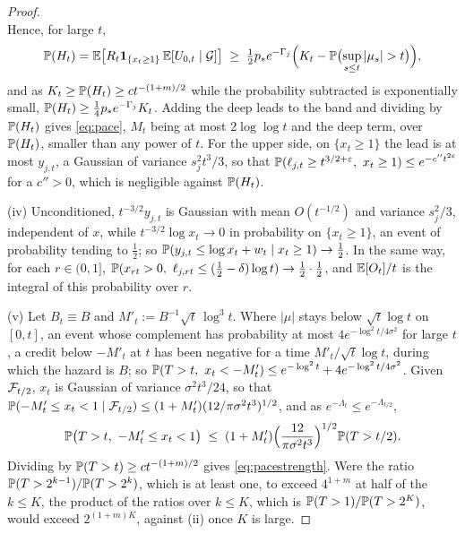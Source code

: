 \begin{proof}
\[\]
Hence, for large $t$,
\[
\PP(H_t)=\E\bigl[R_t\one_{\{x_t\ge1\}}\,\E[U_{0,t}\mid\mathcal G]\bigr]
\;\ge\;\tfrac12p_*e^{-\Gamma_j}\Bigl(K_t-\PP\bigl(\sup_{s\le t}|\mu_s|>t\bigr)\Bigr),
\]
and as $K_t\ge\mathbb{P}(H_t)\ge ct^{-(1+m)/2}$ while the probability subtracted
is exponentially small, $\mathbb{P}(H_t)\ge\tfrac14p_*e^{-\Gamma_j}K_t$. Adding
the deep leads to the band and dividing by $\mathbb{P}(H_t)$ gives
\eqref{eq:pace}, $M_t$ being at most $2\log\log t$ and the deep term, over
$\mathbb{P}(H_t)$, smaller than any power of $t$. For the upper side, on
$\{x_t\ge1\}$ the lead is at most $y_{j,t}$, a Gaussian of variance
$s_j^2t^3/3$, so that
$\mathbb{P}(\ell_{j,t}\ge t^{3/2+\varepsilon},\ x_t\ge1)\le e^{-c''t^{2\varepsilon}}$
for a $c''>0$, which is negligible against $\mathbb{P}(H_t)$.

(iv) Unconditioned, $t^{-3/2}y_{j,t}$ is Gaussian with mean $O(t^{-1/2})$
and variance $s_j^2/3$, independent of $x$, while $t^{-3/2}\log x_t\to0$
in probability on $\{x_t\ge1\}$, an event of probability tending to
$\tfrac12$; so $\mathbb{P}(y_{j,t}\le\log x_t+w_t\mid x_t\ge1)\to\tfrac12$. In the
same way, for each $r\in(0,1]$,
$\PP(x_{rt}>0,\ \ell_{j,rt}\le(\tfrac12-\delta)\log t)\to\tfrac12\cdot\tfrac12$,
and $\mathbb{E}[O_t]/t$ is the integral of this probability over $r$.

(v) Let $B_t\equiv B$ and $M'_t:=B^{-1}\sqrt t\,\log^3t$. Where $|\mu|$
stays below $\sqrt t\log t$ on $[0,t]$, an event whose complement has
probability at most $4e^{-\log^2t/4\sigma^2}$ for large $t$, a credit
below $-M'_t$ at $t$ has been negative for a time $M'_t/\sqrt t\log t$,
during which the hazard is $B$; so
$\mathbb{P}(T>t,\ x_t<-M'_t)\le e^{-\log^2t}+4e^{-\log^2t/4\sigma^2}$. Given
$\mathcal{F}_{t/2}$, $x_t$ is Gaussian of variance $\sigma^2t^3/24$, so that
$\mathbb{P}(-M'_t\le x_t<1\mid\mathcal{F}_{t/2})\le(1+M'_t)(12/\pi\sigma^2t^3)^{1/2}$, and
as $e^{-\Lambda_t}\le e^{-\Lambda_{t/2}}$,
\[
\mathbb{P}\bigl(T>t,\ -M'_t\le x_t<1\bigr)\;\le\;
(1+M'_t)\Bigl(\frac{12}{\pi\sigma^2t^3}\Bigr)^{1/2}\mathbb{P}(T>t/2).
\]
Dividing by $\mathbb{P}(T>t)\ge ct^{-(1+m)/2}$ gives \eqref{eq:pacestrength}.
Were the ratio $\mathbb{P}(T>2^{k-1})/\mathbb{P}(T>2^k)$, which is at least one, to
exceed $4^{1+m}$ at half of the $k\le K$, the product of the ratios over
$k\le K$, which is $\mathbb{P}(T>1)/\mathbb{P}(T>2^K)$, would exceed $2^{(1+m)K}$,
against (ii) once $K$ is large.
\end{proof}

